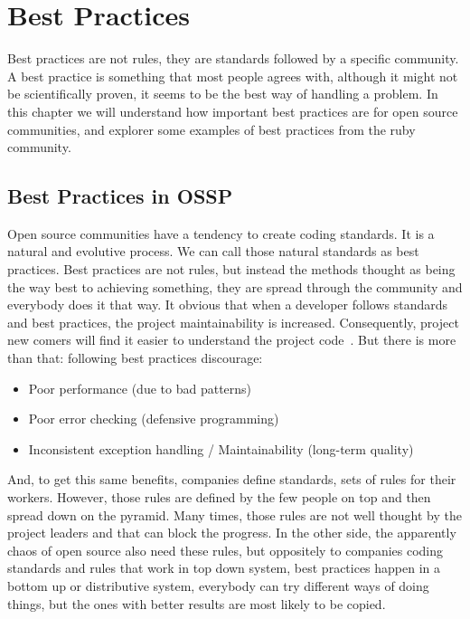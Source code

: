 \thispagestyle{empty}
\chapter{Best Practices}\label{chap:best_practices}

Best practices are not rules, they are standards followed by a specific community. 
A best practice is something that most people agrees with, 
although it might not be scientifically proven,
it seems to be the best way of handling a problem.
In this chapter we will understand how important best practices are for open source communities, 
and explorer some examples of best practices from the ruby community.



\section{Best Practices in OSSP} \label{sec:best_practices_ossp}
Open source communities have a tendency to create coding standards. It is a natural and evolutive process.
We can call those natural standards as best practices. 
Best practices are not rules, but instead the methods thought as being the way best to achieving something, 
they are spread through the community and everybody does it that way.
It obvious that when a developer follows standards and best practices, the project maintainability is increased.
Consequently, project new comers will find it easier to understand the project code~\cite{dromey2002model}.
But there is more than that: following best practices discourage:
\begin{itemize}
\item Poor performance (due to bad patterns)
\item Poor error checking (defensive programming)
\item Inconsistent exception handling / Maintainability (long-term quality)
\end{itemize}

And, to get this same benefits, companies define standards, sets of rules for their workers.
However, those rules are defined by the few people on top and then spread down on the pyramid.
Many times, those rules are not well thought by the project leaders and that can block the progress.
In the other side, the apparently chaos of open source also need these rules, 
but oppositely to companies coding standards and rules that work in top down system, 
best practices happen in a bottom up or distributive system, 
everybody can try different ways of doing things, 
but the ones with better results are most likely to be copied.

